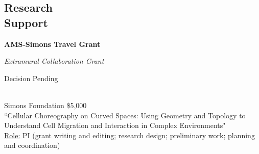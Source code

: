 \documentclass[margin,line]{res}
\begin{document}
\begin{resume}

\section{\sc Research\\ Support}

\noindent
\begin{minipage}[t]{0.35\textwidth}
    \raggedright \textbf{AMS-Simons Travel Grant}
\end{minipage}%
\begin{minipage}[t]{0.35\textwidth}
    \centering \textit{Extramural Collaboration Grant}
\end{minipage}%
\begin{minipage}[t]{0.3\textwidth}
    \raggedleft Decision Pending
\end{minipage}
\\[.2em]
Simons Foundation \hfill \$5,000\\[.2em]
``Cellular Choreography on Curved Spaces: Using Geometry and Topology to Understand Cell Migration and Interaction in Complex Environments"\\[.2em]
\ul{Role:} PI {\small (grant writing and editing; research design; preliminary work; planning and coordination)}


\end{resume}
\end{document}
